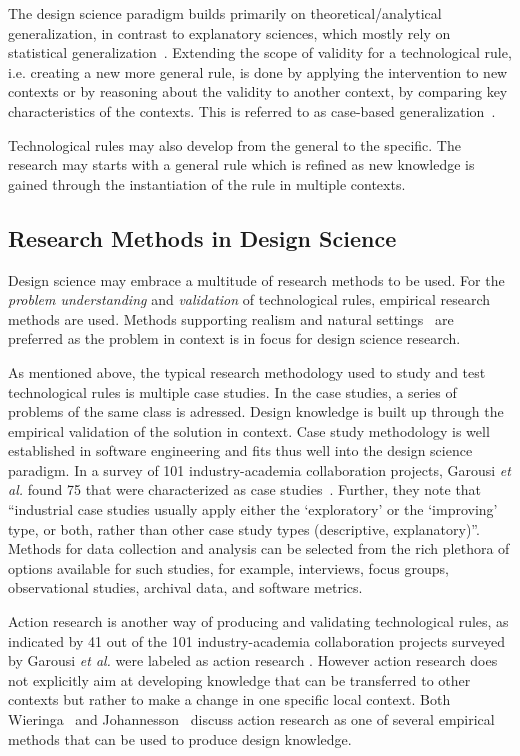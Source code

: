 \documentclass[graybox]{svmult}
\begin{document}
The design science paradigm builds primarily on theoretical/analytical generalization, in contrast to explanatory sciences, which mostly rely on statistical generalization~\cite[p. 30]{Runeson12Case}. Extending the scope of validity for a technological rule, i.e. creating a new more general rule, is done by applying the intervention to new contexts or by reasoning about the validity to another context, by comparing key characteristics of the contexts. This is referred to as case-based generalization~\cite{wieringa_six_2015}.  

Technological rules may also develop from the general to the specific. The research may starts with a general rule which is refined as new knowledge is gained through the instantiation of the rule in multiple contexts. 


\subsection{Research Methods in Design Science} 


Design science may embrace a multitude of research methods to be used. For the \emph{problem understanding} and \emph{validation} of technological rules, empirical research methods are used. Methods supporting realism and natural settings~\cite{StolABC18} are preferred as the problem in context is in focus for design science research. 

As mentioned above, the typical research methodology used to study and test technological rules is multiple case studies. In the case studies, a series of problems of the same class is adressed. Design knowledge is built up through the empirical validation of the solution in context. Case study methodology is well established in software engineering \cite{Runeson12Case} and fits thus well into the design science paradigm. In a survey of 101 industry-academia collaboration projects, Garousi \emph{et al.} found 75 that were characterized as case studies~\cite{Garousi2019}. Further, they note that ``industrial case studies usually apply either the `exploratory' or the `improving' type, or both, rather than other case study types (descriptive, explanatory)''. Methods for data collection and analysis can be selected from the rich plethora of options available for such studies, for example, interviews, focus groups, observational studies, archival data, and software metrics. 

Action research is another way of producing and validating technological rules, as indicated by 41 out of the 101 industry-academia collaboration projects surveyed by Garousi \emph{et al.} were labeled as action research \cite{Garousi2019}. However action research does not explicitly aim at developing knowledge that can be transferred to other contexts but rather to make a change in one specific local context. Both Wieringa~\cite{wieringa_technical_2012} and Johannesson~\cite{johannesson_introduction_2014} discuss action research as one of several empirical methods that can be used to produce design knowledge.
\end{document}
